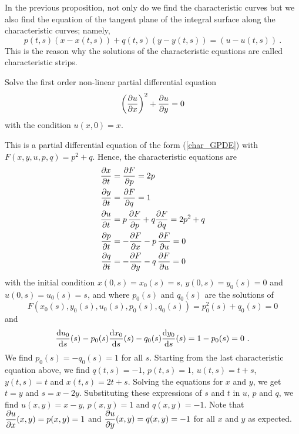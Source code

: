 \begin{rmk}
In the previous proposition, not only do we find the characteristic
curves but we also find the equation of the tangent plane of the
integral surface along the characteristic curves; namely,
\[
p(t,s)(x-x(t,s)) + q(t,s)(y-y(t,s)) = (u - u(t,s)) \ .
\]
This is the reason why the solutions of the characteristic equations
are called characteristic strips.
\end{rmk}

\begin{egg}
Solve the first order non-linear partial differential equation
\[
\left(\frac{\partial{u}}{\partial x}\right)^2 + \frac{\partial{u}}{\partial y} = 0
\]
with the condition $u(x,0)=x$.

This is a partial differential equation of the form (\ref{char_GPDE})
with $\displaystyle F(x,y,u,p,q)=p^2+q$.  Hence, the characteristic
equations are
\begin{align*}
\frac{\partial{x}}{\partial t} &= \frac{\partial{F}}{\partial p} = 2p \\
\frac{\partial{y}}{\partial t} &= \frac{\partial{F}}{\partial q} = 1 \\
\frac{\partial{u}}{\partial t} &= p\, \frac{\partial{F}}{\partial p} + q \frac{\partial{F}}{\partial q} = 2p^2 +q \\
\frac{\partial{p}}{\partial t} &= -\frac{\partial{F}}{\partial x} - p \, \frac{\partial{F}}{\partial u} = 0 \\
\frac{\partial{q}}{\partial t} &= -\frac{\partial{F}}{\partial y} - q \, \frac{\partial{F}}{\partial u} = 0
\end{align*}
with the initial condition $x(0,s) = x_0(s) = s$, $y(0,s) = y_0(s) = 0$
and $u(0,s) = u_0(s) = s$, and where $p_0(s)$ and
$q_0(s)$ are the solutions of
\[
F\left(x_0(s),y_0(s),u_0(s), p_0(s),q_0(s) \right) = p_0^2(s) + q_0(s) = 0
\]
and
\[
\frac{\mathrm{d}u_0}{\mathrm{d}{s}}(s) - p_0(s)\frac{\mathrm{d}x_0}{\mathrm{d}{s}}(s)- q_0(s)\frac{\mathrm{d}y_0}{\mathrm{d}{s}}(s)
= 1 - p_0(s) = 0 \ .
\]
We find $p_0(s) = - q_0(s) = 1$ for all $s$.  Starting from the last
characteristic equation above, we find
$q(t,s) = -1$, $p(t,s) = 1$, $u(t,s) = t + s$, $y(t,s) = t$ and
$x(t,s) = 2t + s$.  Solving the equations for $x$ and $y$, we get
$t=y$ and $s=x-2y$.  Substituting these expressions of $s$ and $t$ in
$u$, $p$ and $q$, we find $u(x,y) = x -y$, $p(x,y) = 1$ and $q(x,y) = -1$.
Note that $\displaystyle \frac{\partial{u}}{\partial x}(x,y) = p(x,y) = 1$ and 
$\displaystyle \frac{\partial{u}}{\partial y}(x,y) = q(x,y) = -1$ for all $x$ and $y$ as
expected.
\end{egg}

